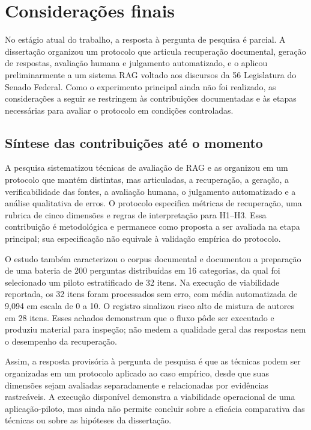 \section{Considerações finais}
\label{sec:finais}

No estágio atual do trabalho, a resposta à pergunta de pesquisa é parcial. A dissertação organizou um protocolo que articula recuperação documental, geração de respostas, avaliação humana e julgamento automatizado, e o aplicou preliminarmente a um sistema RAG voltado aos discursos da 56\textordfeminine{} Legislatura do Senado Federal. Como o experimento principal ainda não foi realizado, as considerações a seguir se restringem às contribuições documentadas e às etapas necessárias para avaliar o protocolo em condições controladas.

\subsection{Síntese das contribuições até o momento}

A pesquisa sistematizou técnicas de avaliação de RAG e as organizou em um protocolo que mantém distintas, mas articuladas, a recuperação, a geração, a verificabilidade das fontes, a avaliação humana, o julgamento automatizado e a análise qualitativa de erros. O protocolo especifica métricas de recuperação, uma rubrica de cinco dimensões e regras de interpretação para H1--H3. Essa contribuição é metodológica e permanece como proposta a ser avaliada na etapa principal; sua especificação não equivale à validação empírica do protocolo.

O estudo também caracterizou o corpus documental e documentou a preparação de uma bateria de 200 perguntas distribuídas em 16 categorias, da qual foi selecionado um piloto estratificado de 32 itens. Na execução de viabilidade reportada, os 32 itens foram processados sem erro, com média automatizada de 9,094 em escala de 0 a 10. O registro sinalizou risco alto de mistura de autores em 28 itens. Esses achados demonstram que o fluxo pôde ser executado e produziu material para inspeção; não medem a qualidade geral das respostas nem o desempenho da recuperação.

Assim, a resposta provisória à pergunta de pesquisa é que as técnicas podem ser organizadas em um protocolo aplicado ao caso empírico, desde que suas dimensões sejam avaliadas separadamente e relacionadas por evidências rastreáveis. A execução disponível demonstra a viabilidade operacional de uma aplicação-piloto, mas ainda não permite concluir sobre a eficácia comparativa das técnicas ou sobre as hipóteses da dissertação.

